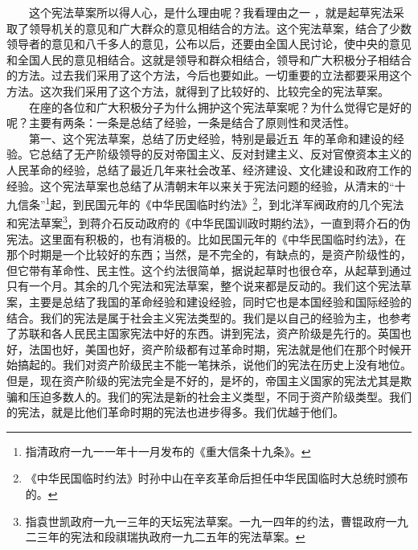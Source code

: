 \documentclass[cn,11pt,chinese]{elegantbook}
\begin{document}
　　这个宪法草案所以得人心，是什么理由呢？我看理由之一 ，就是起草宪法采取了领导机关的意见和广大群众的意见相结合的方法。这个宪法草案，结合了少数领导者的意见和八千多人的意见，公布以后，还要由全国人民讨论，使中央的意见和全国人民的意见相结合。这就是领导和群众相结合，领导和广大积极分子相结合的方法。过去我们采用了这个方法，今后也要如此。一切重要的立法都要采用这个方法。这次我们采用了这个方法，就得到了比较好的、比较完全的宪法草案。\\
　　在座的各位和广大积极分子为什么拥护这个宪法草案呢？为什么觉得它是好的呢？主要有两条：一条是总结了经验，一条是结合了原则性和灵活性。\\
　　第一、这个宪法草案，总结了历史经验，特别是最近五 年的革命和建设的经验。它总结了无产阶级领导的反对帝国主义、反对封建主义、反对官僚资本主义的人民革命的经验，总结了最近几年来社会改革、经济建设、文化建设和政府工作的经验。这个宪法草案也总结了从清朝末年以来关于宪法问题的经验，从清末的“十九信条”\footnote[1]{ 指清政府一九一一年十一月发布的《重大信条十九条》。}起，到民国元年的《中华民国临时约法》\footnote[2]{ 《中华民国临时约法》时孙中山在辛亥革命后担任中华民国临时大总统时颁布的。}，到北洋军阀政府的几个宪法和宪法草案\footnote[3]{ 指袁世凯政府一九一三年的天坛宪法草案。一九一四年的约法，曹锟政府一九二三年的宪法和段祺瑞执政府一九二五年的宪法草案。}，到蒋介石反动政府的《中华民国训政时期约法》，一直到蒋介石的伪宪法。这里面有积极的，也有消极的。比如民国元年的《中华民国临时约法》，在那个时期是一个比较好的东西；当然，是不完全的，有缺点的，是资产阶级性的，但它带有革命性、民主性。这个约法很简单，据说起草时也很仓卒，从起草到通过只有一个月。其余的几个宪法和宪法草案，整个说来都是反动的。我们这个宪法草案，主要是总结了我国的革命经验和建设经验，同时它也是本国经验和国际经验的结合。我们的宪法是属于社会主义宪法类型的。我们是以自己的经验为主，也参考了苏联和各人民民主国家宪法中好的东西。讲到宪法，资产阶级是先行的。英国也好，法国也好，美国也好，资产阶级都有过革命时期，宪法就是他们在那个时候开始搞起的。我们对资产阶级民主不能一笔抹杀，说他们的宪法在历史上没有地位。但是，现在资产阶级的宪法完全是不好的，是坏的，帝国主义国家的宪法尤其是欺骗和压迫多数人的。我们的宪法是新的社会主义类型，不同于资产阶级类型。我们的宪法，就是比他们革命时期的宪法也进步得多。我们优越于他们。\\
\end{document}
